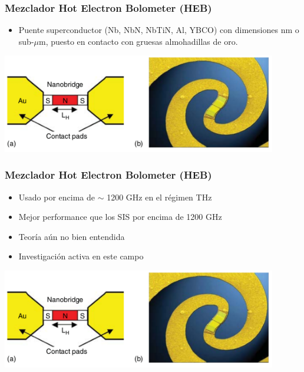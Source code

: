 \documentclass{beamer}
\begin{document}
\begin{frame}
				\frametitle{Mezclador Hot Electron Bolometer (HEB)}
				\begin{itemize}
								\item Puente superconductor (\alert{Nb, NbN,
												NbTiN, Al, YBCO}) con dimensiones nm o sub-$\mu$m,
												puesto en contacto con gruesas almohadillas de oro.
				\end{itemize}
								\begin{center}
												\includegraphics[height=0.48\textheight,width=0.9\textwidth]{heb_mixer}
								\end{center}
\end{frame} 

\begin{frame}
				\frametitle{Mezclador Hot Electron Bolometer (HEB)}
				\begin{itemize}
								\item Usado por encima de $\sim$ 1200 GHz en el régimen THz
								\item Mejor performance que los SIS por encima de 1200 GHz
								\item Teoría aún no bien entendida
								\item Investigación activa en este campo
				\end{itemize}
								\begin{center}
												\includegraphics[height=0.48\textheight,width=0.9\textwidth]{heb_mixer}
								\end{center}
\end{frame} 
\end{document}
